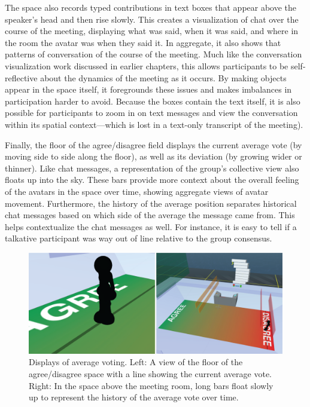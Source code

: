 The space also records typed contributions in text boxes that appear above the speaker's head and then rise slowly. This creates a visualization of chat over the course of the meeting, displaying what was said, when it was said, and where in the room the avatar was when they said it. \citep{DiMicco:2007ie} In aggregate, it also shows that patterns of conversation of the course of the meeting. Much like the conversation visualization work discussed in earlier chapters, this allows participants to be self-reflective about the dynamics of the meeting as it occurs. By making objects appear in the space itself, it foregrounds these issues and makes imbalances in participation harder to avoid. Because the boxes contain the text itself, it is also possible for participants to zoom in on text messages and view the conversation within its spatial context---which is lost in a text-only transcript of the meeting).

Finally, the floor of the agree/disagree field displays the current average vote (by moving side to side along the floor), as well as its deviation (by growing wider or thinner). Like chat messages, a representation of the group's collective view also floats up into the sky. These bars provide more context about the overall feeling of the avatars in the space over time, showing aggregate views of avatar movement. Furthermore, the history of the average position separates historical chat messages based on which side of the average the message came from. This helps contextualize the chat messages as well. For instance, it is easy to tell if a talkative participant was way out of line relative to the group consensus.

\begin{figure}[t]
	\includegraphics{figures/average+history.png}
	\caption{Displays of average voting. Left: A view of the floor of the agree/disagree space with a line showing the current average vote. Right: In the space above the meeting room, long bars float slowly up to represent the history of the average vote over time.}
	\label{fig:information_space_average_history}
\end{figure}

